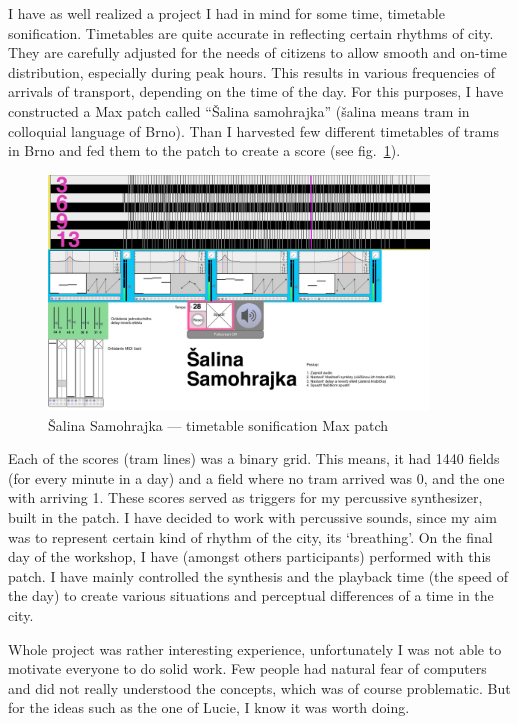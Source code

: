 \documentclass[12pt,a4paper,oneside]{report}
\begin{document}
I have as well realized a project I had in mind for some time, timetable sonification. Timetables are quite accurate in reflecting certain rhythms of city. They are carefully adjusted for the needs of citizens to allow smooth and on-time distribution, especially during peak hours. This results in various frequencies of arrivals of transport, depending on the time of the day. For this purposes, I have constructed a Max patch called ``Šalina samohrajka'' (šalina means tram in colloquial language of Brno). Than I harvested few different timetables of trams in Brno and fed them to the patch to create a score (see fig.~\ref{fig:salina}).

\begin{figure}  
  \centering
    \includegraphics[width=0.9\textwidth]{img/salina}
	\caption{Šalina Samohrajka --- timetable sonification Max patch}
	\label{fig:salina}
\end{figure}

Each of the scores (tram lines) was a binary grid. This means, it had 1440 fields (for every minute in a day) and a field where no tram arrived was 0, and the one with arriving 1. These scores served as triggers for my percussive synthesizer, built in the patch. I have decided to work with percussive sounds, since my aim was to represent certain kind of rhythm of the city, its `breathing'. On the final day of the workshop, I have (amongst others participants) performed with this patch. I have mainly controlled the synthesis and the playback time (the speed of the day) to create various situations and perceptual differences of a time in the city. 

Whole project was rather interesting experience, unfortunately I was not able to motivate everyone to do solid work. Few people had natural fear of computers and did not really understood the concepts, which was of course problematic. But for the ideas such as the one of Lucie, I know it was worth doing.
\end{document}
